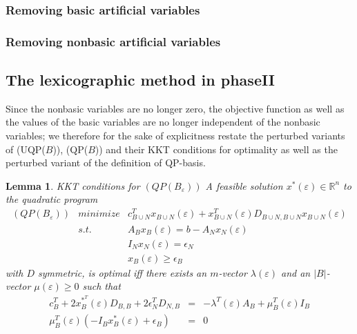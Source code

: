 \documentclass[a4paper]{article}
\newtheorem{lemma}{Lemma}
\begin{document}
\subsubsection{Removing basic artificial variables}
\subsubsection{Removing nonbasic artificial variables}

\subsection{The lexicographic method in phaseII}
Since the nonbasic variables are no longer zero, the objective function as well as
the values of the basic variables are no longer independent of the nonbasic
variables; we therefore for the sake of explicitness restate the perturbed
variants of (UQP($B$)), (QP($B$)) and their KKT conditions for optimality
as well as the perturbed variant of the definition of QP-basis.

\begin{lemma}{KKT conditions for $(QP(B_{\varepsilon}))$}
\label{lemma:KKT_QP(B)_epsilon}
A feasible solution $x^{*}(\varepsilon) \in \mathbb{R}^{n}$ to the quadratic
program
\begin{eqnarray*}
  \mbox{$(QP(B_{\varepsilon}))$} & minimize & c_{B \cup N}^{T}
    x_{B \cup N}(\varepsilon)
    + x_{B \cup N}^{T}(\varepsilon) 
    D_{B \cup N, B \cup N} x_{B \cup N}(\varepsilon) \\
    & s.t. & A_{B}x_{B}(\varepsilon) = b - A_{N}x_{N}(\varepsilon)  \\
    & & I_{N}x_{N}(\varepsilon) = \epsilon_{N}  \\
    & & x_{B}(\varepsilon) \geq \epsilon_{B}
\end{eqnarray*}
with $D$ symmetric, is optimal iff there exists an $m$-vector
$\lambda(\varepsilon)$ and an $\left|B\right|$-vector $\mu(\varepsilon) \geq 0$
such that
\begin{eqnarray}
  c_{B}^{T} + 2x_{B}^{*^{\scriptstyle{T}}}(\varepsilon)D_{B,B} +
  2\epsilon_{N}^{T}D_{N,B} & = &
  -\lambda^{T}(\varepsilon)A_{B} + \mu_{B}^{T}(\varepsilon)I_{B} \\
  \mu_{B}^{T}(\varepsilon) \left( -I_{B}x_{B}^{*}(\varepsilon) +
    \epsilon_{B} \right) & = & 0
\end{eqnarray}
\end{lemma}
\end{document}
